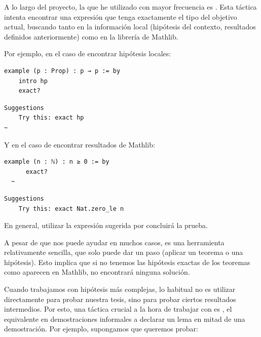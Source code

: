 A lo largo del proyecto, la que he utilizado con mayor frecuencia es . Esta táctica intenta encontrar una expresión que tenga exactamente el tipo del objetivo actual, buscando tanto en la información local (hipótesis del contexto, resultados definidos anteriormente) como en la librería de Mathlib.

Por ejemplo, en el caso de encontrar hipótesis locales:

\begin{minipage}[t]{0.58\textwidth}
\begin{lstlisting}[language=lean]
  example (p : Prop) : p → p := by
    intro hp
    exact?
\end{lstlisting}
\end{minipage}%
\hfill
\begin{minipage}[t]{0.40\textwidth}
\begin{lstlisting}[language=infoview]
  Suggestions
    Try this: exact hp
~
\end{lstlisting}
\end{minipage}

Y en el caso de encontrar resultados de Mathlib:

\begin{minipage}[t]{0.58\textwidth}
\begin{lstlisting}[language=lean]
  example (n : ℕ) : n ≥ 0 := by
	  exact?
  ~
\end{lstlisting}
\end{minipage}%
\hfill
\begin{minipage}[t]{0.40\textwidth}
\begin{lstlisting}[language=infoview]
  Suggestions
    Try this: exact Nat.zero_le n
\end{lstlisting}
\end{minipage}

En general, utilizar la expresión sugerida por  concluirá la prueba.

A pesar de que  nos puede ayudar en muchos casos, es una herramienta relativamente sencilla, que solo puede dar un paso (aplicar un teorema o una hipótesis). Esto implica que si no tenemos las hipótesis exactas de los teoremas como aparecen en Mathlib,  no encontrará ninguna solución.

Cuando trabajamos con hipótesis más complejas, lo habitual no es utilizar  directamente para probar nuestra tesis, sino para probar ciertos resultados intermedios. Por esto, una táctica crucial a la hora de trabajar con  es , el equivalente en demostraciones informales a declarar un lema en mitad de una demostración. Por ejemplo, supongamos que queremos probar:


